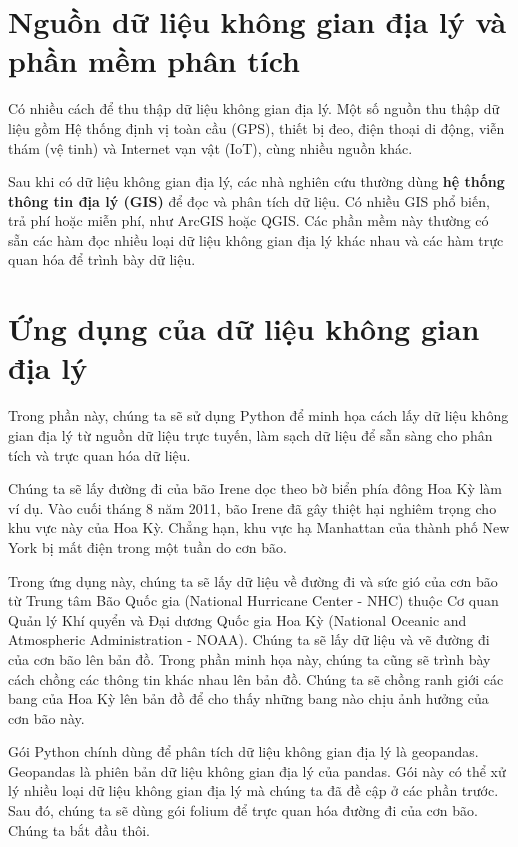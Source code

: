 \section{Nguồn dữ liệu không gian địa lý và phần mềm phân tích}

Có nhiều cách để thu thập dữ liệu không gian địa lý. Một số nguồn thu thập dữ liệu gồm Hệ thống định vị toàn cầu (GPS), thiết bị đeo, điện thoại di động, viễn thám (vệ tinh) và Internet vạn vật (IoT), cùng nhiều nguồn khác.

Sau khi có dữ liệu không gian địa lý, các nhà nghiên cứu thường dùng \textbf{hệ thống thông tin địa lý (GIS)} để đọc và phân tích dữ liệu. Có nhiều GIS phổ biến, trả phí hoặc miễn phí, như ArcGIS hoặc QGIS. Các phần mềm này thường có sẵn các hàm đọc nhiều loại dữ liệu không gian địa lý khác nhau và các hàm trực quan hóa để trình bày dữ liệu.

\section{Ứng dụng của dữ liệu không gian địa lý}

Trong phần này, chúng ta sẽ sử dụng Python để minh họa cách lấy dữ liệu không gian địa lý từ nguồn dữ liệu trực tuyến, làm sạch dữ liệu để sẵn sàng cho phân tích và trực quan hóa dữ liệu.

Chúng ta sẽ lấy đường đi của bão Irene dọc theo bờ biển phía đông Hoa Kỳ làm ví dụ. Vào cuối tháng 8 năm 2011, bão Irene đã gây thiệt hại nghiêm trọng cho khu vực này của Hoa Kỳ. Chẳng hạn, khu vực hạ Manhattan của thành phố New York bị mất điện trong một tuần do cơn bão.

Trong ứng dụng này, chúng ta sẽ lấy dữ liệu về đường đi và sức gió của cơn bão từ Trung tâm Bão Quốc gia (National Hurricane Center - NHC) thuộc Cơ quan Quản lý Khí quyển và Đại dương Quốc gia Hoa Kỳ (National Oceanic and Atmospheric Administration - NOAA). Chúng ta sẽ lấy dữ liệu và vẽ đường đi của cơn bão lên bản đồ. Trong phần minh họa này, chúng ta cũng sẽ trình bày cách chồng các thông tin khác nhau lên bản đồ. Chúng ta sẽ chồng ranh giới các bang của Hoa Kỳ lên bản đồ để cho thấy những bang nào chịu ảnh hưởng của cơn bão này.

Gói Python chính dùng để phân tích dữ liệu không gian địa lý là geopandas. Geopandas là phiên bản dữ liệu không gian địa lý của pandas. Gói này có thể xử lý nhiều loại dữ liệu không gian địa lý mà chúng ta đã đề cập ở các phần trước. Sau đó, chúng ta sẽ dùng gói folium để trực quan hóa đường đi của cơn bão. Chúng ta bắt đầu thôi.

